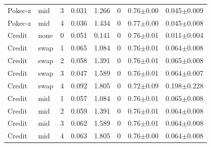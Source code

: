 \begin{table}[t]
\begin{tabular}{llcccccc}
Pokec-z & mid & 3 & 0.031 & 1.266 & 0 & 0.76$\pm$0.00 & 0.045$\pm$0.009 \\
Pokec-z & mid & 4 & 0.036 & 1.434 & 0 & 0.77$\pm$0.00 & 0.045$\pm$0.008 \\
Credit & none & 0 & 0.051 & 0.141 & 0 & 0.76$\pm$0.01 & 0.011$\pm$0.004 \\
Credit & swap & 1 & 0.065 & 1.084 & 0 & 0.76$\pm$0.01 & 0.064$\pm$0.008 \\
Credit & swap & 2 & 0.058 & 1.391 & 0 & 0.76$\pm$0.01 & 0.065$\pm$0.008 \\
Credit & swap & 3 & 0.047 & 1.589 & 0 & 0.76$\pm$0.01 & 0.064$\pm$0.007 \\
Credit & swap & 4 & 0.092 & 1.805 & 0 & 0.72$\pm$0.09 & 0.198$\pm$0.228 \\
Credit & mid & 1 & 0.057 & 1.084 & 0 & 0.76$\pm$0.01 & 0.065$\pm$0.008 \\
Credit & mid & 2 & 0.059 & 1.391 & 0 & 0.76$\pm$0.01 & 0.064$\pm$0.008 \\
Credit & mid & 3 & 0.062 & 1.589 & 0 & 0.76$\pm$0.01 & 0.064$\pm$0.008 \\
Credit & mid & 4 & 0.063 & 1.805 & 0 & 0.76$\pm$0.00 & 0.064$\pm$0.008 \\
\bottomrule
\end{tabular}
\end{table}
